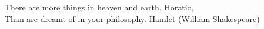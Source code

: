 \begin{acknowledgements}

\end{acknowledgements}



\tableofcontents

\renewcommand{\listfigurename}{List of figures}
\renewcommand{\listtablename}{List of tables}

\listoffigures
\listoftables

\frontquote%
{There are more things in heaven and earth, Horatio, \\
Than are dreamt of in your philosophy.} 
  {Hamlet (William Shakespeare)}
